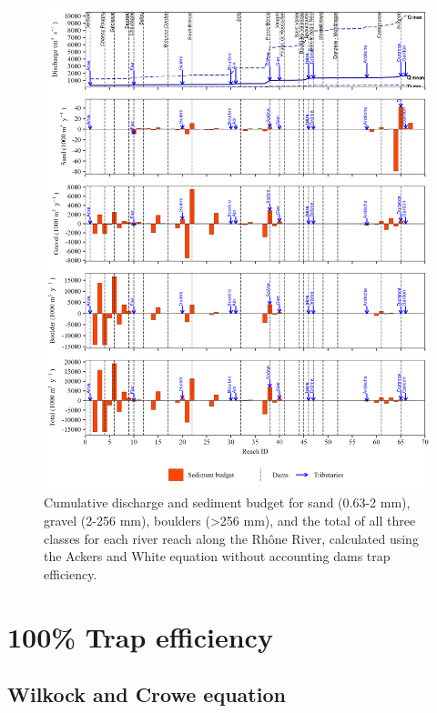 \documentclass[
]{book}
\begin{document}
\begin{figure}
\includegraphics[width=26.24in]{img/res_cascade/res_E0_eA&W_noDams/plots_sed_budget-silt/sed_bud_res_sum_hy_E0_eA&W_noDams} \caption{Cumulative discharge and sediment budget for sand (0.63-2 mm), gravel (2-256 mm), boulders (>256 mm), and the total of all three classes for each river reach along the Rhône River, calculated using the Ackers and White equation without accounting dams trap efficiency.}\label{fig:budgetE0eA}
\end{figure}

\section{100\% Trap efficiency}\label{trap-efficiency}

\subsection{Wilkock and Crowe equation}\label{wilkock-and-crowe-equation-1}
\end{document}
